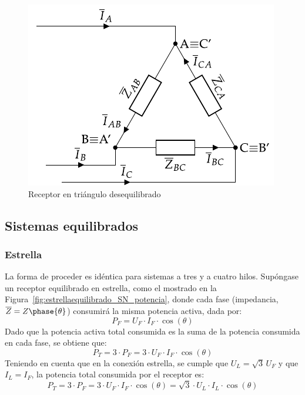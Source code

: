 	\begin{figure}
	    \centering
	    \includegraphics{../figs/trianguloDesequilibrado_receptor.pdf}
	    \caption{Receptor en triángulo desequilibrado}
	    \label{fig:trianguloDesequilibrado_receptor_potencia}
	\end{figure}
	
	\subsection{Sistemas equilibrados}
	
	\subsubsection{Estrella}
	
	La forma de proceder es idéntica para sistemas a tres y a cuatro hilos. Supóngase un receptor equilibrado en estrella, como el mostrado en la Figura~\ref{fig:estrellaequilibrado_SN_potencia}, donde cada fase (impedancia, $\overline{Z}=Z\phase{\theta}$) consumirá la misma potencia activa, dada por: 
	\begin{equation*}
	    P_F=U_{F}\cdot I_F \cdot \cos(\theta)
	\end{equation*}
	Dado que la potencia activa total consumida es la suma de la potencia consumida en cada fase, se obtiene que:
	\begin{equation*}
	    P_T=3\cdot P_F=3\cdot U_F\cdot I_F\cdot\cos(\theta)
	\end{equation*}
	Teniendo en cuenta que en la conexión estrella, se cumple que $U_L=\sqrt{3}\,U_F$ y que $I_L=I_F$, la potencia total consumida por el receptor es: 
	\begin{equation}
	    \boxed{P_T=3\cdot P_F=3\cdot U_F\cdot {I_F}\cdot\cos(\theta)=\sqrt{3}\cdot U_L\cdot I_L\cdot\cos(\theta)}
	\end{equation}
	
